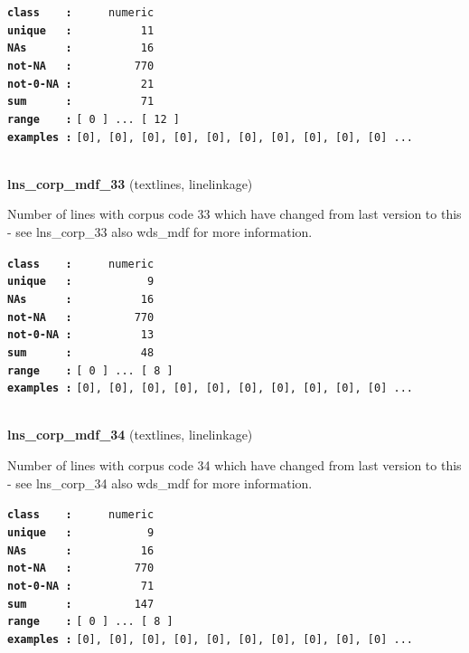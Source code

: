 \documentclass[]{article}
\begin{document}
\textbf{\texttt{class\ \ \ \ :}} \texttt{~~~~~numeric}\\
\textbf{\texttt{unique\ \ \ :}} \texttt{~~~~~~~~~~11}\\
\textbf{\texttt{NAs\ \ \ \ \ \ :}} \texttt{~~~~~~~~~~16}\\
\textbf{\texttt{not-NA\ \ \ :}} \texttt{~~~~~~~~~770}\\
\textbf{\texttt{not-0-NA\ :}} \texttt{~~~~~~~~~~21}\\
\textbf{\texttt{sum\ \ \ \ \ \ :}} \texttt{~~~~~~~~~~71}\\
\textbf{\texttt{range\ \ \ \ :}}
\texttt{{[}\ 0\ {]}\ ...\ {[}\ 12\ {]}}\\
\textbf{\texttt{examples\ :}}
\texttt{{[}0{]},\ {[}0{]},\ {[}0{]},\ {[}0{]},\ {[}0{]},\ {[}0{]},\ {[}0{]},\ {[}0{]},\ {[}0{]},\ {[}0{]}\ ...}\\

~

\textbf{lns\_corp\_mdf\_33} (textlines, linelinkage)

Number of lines with corpus code 33 which have changed from last version
to this - see lns\_corp\_33 also wds\_mdf for more information.

\textbf{\texttt{class\ \ \ \ :}} \texttt{~~~~~numeric}\\
\textbf{\texttt{unique\ \ \ :}} \texttt{~~~~~~~~~~~9}\\
\textbf{\texttt{NAs\ \ \ \ \ \ :}} \texttt{~~~~~~~~~~16}\\
\textbf{\texttt{not-NA\ \ \ :}} \texttt{~~~~~~~~~770}\\
\textbf{\texttt{not-0-NA\ :}} \texttt{~~~~~~~~~~13}\\
\textbf{\texttt{sum\ \ \ \ \ \ :}} \texttt{~~~~~~~~~~48}\\
\textbf{\texttt{range\ \ \ \ :}}
\texttt{{[}\ 0\ {]}\ ...\ {[}\ 8\ {]}}\\
\textbf{\texttt{examples\ :}}
\texttt{{[}0{]},\ {[}0{]},\ {[}0{]},\ {[}0{]},\ {[}0{]},\ {[}0{]},\ {[}0{]},\ {[}0{]},\ {[}0{]},\ {[}0{]}\ ...}\\

~

\textbf{lns\_corp\_mdf\_34} (textlines, linelinkage)

Number of lines with corpus code 34 which have changed from last version
to this - see lns\_corp\_34 also wds\_mdf for more information.

\textbf{\texttt{class\ \ \ \ :}} \texttt{~~~~~numeric}\\
\textbf{\texttt{unique\ \ \ :}} \texttt{~~~~~~~~~~~9}\\
\textbf{\texttt{NAs\ \ \ \ \ \ :}} \texttt{~~~~~~~~~~16}\\
\textbf{\texttt{not-NA\ \ \ :}} \texttt{~~~~~~~~~770}\\
\textbf{\texttt{not-0-NA\ :}} \texttt{~~~~~~~~~~71}\\
\textbf{\texttt{sum\ \ \ \ \ \ :}} \texttt{~~~~~~~~~147}\\
\textbf{\texttt{range\ \ \ \ :}}
\texttt{{[}\ 0\ {]}\ ...\ {[}\ 8\ {]}}\\
\textbf{\texttt{examples\ :}}
\texttt{{[}0{]},\ {[}0{]},\ {[}0{]},\ {[}0{]},\ {[}0{]},\ {[}0{]},\ {[}0{]},\ {[}0{]},\ {[}0{]},\ {[}0{]}\ ...}\\
\end{document}
